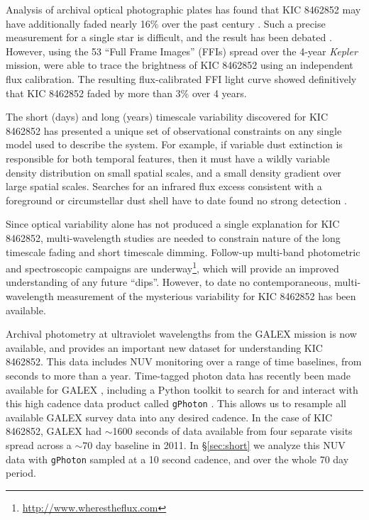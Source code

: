 \documentclass[twocolumn]{aastex6}
\newcommand{\Kepler}{\textsl{Kepler}\xspace}
\begin{document}
Analysis of archival optical photographic plates has found that KIC 8462852 may have additionally faded nearly 16\% over the past century \citep{schaefer2016}. Such a precise measurement for a single star is difficult, and the result has been debated \citep{hippke2016}. However, using the 53 ``Full Frame Images'' (FFIs) spread over the 4-year \Kepler mission, \citet{montet2016} were able to trace the brightness of KIC 8462852 using an independent flux calibration. The resulting flux-calibrated FFI light curve showed definitively that KIC 8462852 faded by more than 3\% over 4 years. %

The short (days) and long (years) timescale variability discovered for KIC 8462852 has presented a unique set of observational constraints on any single model used to describe the system. For example, if variable dust extinction is responsible for both temporal features, then it must have a wildly variable density distribution on small spatial scales, and a small density gradient over large spatial scales. Searches for an infrared flux excess consistent with a foreground or circumstellar dust shell have to date found no strong detection \citep{marengo2015}.


Since optical variability alone has not produced a single explanation for KIC 8462852, multi-wavelength studies are needed to constrain nature of the long timescale fading and short timescale dimming. Follow-up multi-band photometric and spectroscopic campaigns are underway\footnote{\url{http://www.wherestheflux.com}}, which will provide an improved understanding of any future ``dips''. However, to date no contemporaneous, multi-wavelength  measurement of the mysterious variability for KIC 8462852 has been available.


Archival photometry at ultraviolet wavelengths from the GALEX mission \citep{galex} is now available, and provides an important new dataset for understanding KIC 8462852. This data includes NUV monitoring over a range of time baselines, from seconds to more than a year. Time-tagged photon data has recently been made available for GALEX \citep{million2016}, including a Python toolkit to search for and interact with this high cadence data product called {\tt gPhoton} \citep{gphoton}. This allows us to resample all available GALEX survey data into any desired cadence. In the case of KIC 8462852, GALEX had $\sim$1600 seconds of data available from four separate visits spread across a $\sim$70 day baseline in 2011. In \S\ref{sec:short} we analyze this NUV data with {\tt gPhoton} sampled at a 10 second cadence, and over the whole 70 day period.
\end{document}
